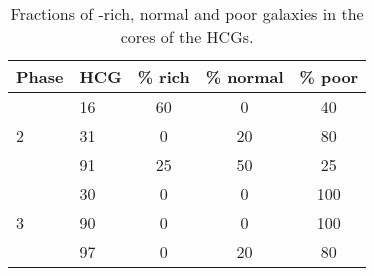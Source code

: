\begin{table}
\centering
\caption{Fractions of \hi-rich, normal and poor galaxies in the cores of the HCGs.}\label{tab:hidef_stats}
\begin{tabular}{l l c c c} 
\hline 
\hline 
Phase & HCG & \% rich & \% normal & \% poor \\ 
\hline
\multirow{3}{*}{2} & 16 & 60 & 0 & 40\\ 
 & 31 & 0 & 20 & 80\\ 
 & 91 & 25 & 50 & 25\\ 
\hline\multirow{3}{*}{3} & 30 & 0 & 0 & 100\\ 
 & 90 & 0 & 0 & 100\\ 
 & 97 & 0 & 20 & 80\\ 
\hline
\end{tabular}
\end{table}